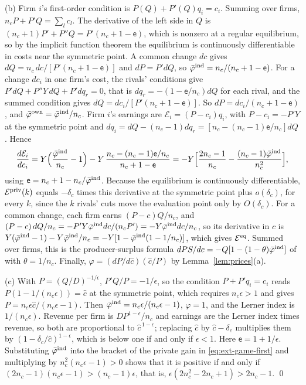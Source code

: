 (b) Firm $i$'s first-order condition is $P(Q)+P'(Q)q_i=c_i$. Summing over firms, $n_cP+P'Q=\sum_lc_l$. The derivative of the left side in $Q$ is $(n_c+1)P'+P''Q=P'(n_c+1-\mathsf e)$, which is nonzero at a regular equilibrium, so by the implicit function theorem the equilibrium is continuously differentiable in costs near the symmetric point. A common change $dc$ gives $dQ=n_c\,dc/[P'(n_c+1-\mathsf e)]$ and $dP=P'dQ$, so $\bar\varphi^{\rm ind}=n_c/(n_c+1-\mathsf e)$. For a change $dc_i$ in one firm's cost, the rivals' conditions give $P'dQ+P''Y\,dQ+P'dq_r=0$, that is $dq_r=-(1-\mathsf e/n_c)dQ$ for each rival, and the summed condition gives $dQ=dc_i/[P'(n_c+1-\mathsf e)]$. So $dP=dc_i/(n_c+1-\mathsf e)$, and $\bar\varphi^{\rm own}=\bar\varphi^{\rm ind}/n_c$. Firm $i$'s earnings are $\mathcal E_i=(P-c_i)q_i$, with $P-c_i=-P'Y$ at the symmetric point and $dq_i=dQ-(n_c-1)dq_r=[n_c-(n_c-1)\mathsf e/n_c]dQ$. Hence
\[
\frac{d\mathcal E_i}{dc_i}=Y\Bigl(\frac{\bar\varphi^{\rm ind}}{n_c}-1\Bigr)-Y\,\frac{n_c-(n_c-1)\mathsf e/n_c}{n_c+1-\mathsf e}=-Y\Bigl[\frac{2n_c-1}{n_c}-\frac{(n_c-1)\bar\varphi^{\rm ind}}{n_c^2}\Bigr],
\]
using $\mathsf e=n_c+1-n_c/\bar\varphi^{\rm ind}$. Because the equilibrium is continuously differentiable, $\mathcal E^{\rm priv}(k)$ equals $-\delta_c$ times this derivative at the symmetric point plus $o(\delta_c)$, for every $k$, since the $k$ rivals' cuts move the evaluation point only by $O(\delta_c)$. For a common change, each firm earns $(P-c)Q/n_c$, and $(P-c)\,dQ/n_c=-P'Y\bar\varphi^{\rm ind}dc/(n_cP')=-Y\bar\varphi^{\rm ind}dc/n_c$, so its derivative in $c$ is $Y(\bar\varphi^{\rm ind}-1)-Y\bar\varphi^{\rm ind}/n_c=-Y[1-\bar\varphi^{\rm ind}(1-1/n_c)]$, which gives $\mathcal E^{\rm eq}$. Summed over firms, this is the producer-surplus formula $dPS/dc=-Q[1-(1-\theta)\bar\varphi^{\rm ind}]$ of \citet{weyl2013pass} with $\theta=1/n_c$. Finally, $\varphi=(dP/d\hat c)(\hat c/P)$ by Lemma~\ref{lem:prices}(a).

(c) With $P=(Q/D)^{-1/\epsilon}$, $P'Q/P=-1/\epsilon$, so the condition $P+P'q_i=c_i$ reads $P(1-1/(n_c\epsilon))=\hat c$ at the symmetric point, which requires $n_c\epsilon>1$ and gives $P=n_c\epsilon\hat c/(n_c\epsilon-1)$. Then $\bar\varphi^{\rm ind}=n_c\epsilon/(n_c\epsilon-1)$, $\varphi=1$, and the Lerner index is $1/(n_c\epsilon)$. Revenue per firm is $DP^{1-\epsilon}/n_c$ and earnings are the Lerner index times revenue, so both are proportional to $\hat c^{\,1-\epsilon}$; replacing $\hat c$ by $\hat c-\delta_c$ multiplies them by $(1-\delta_c/\hat c)^{1-\epsilon}$, which is below one if and only if $\epsilon<1$. Here $\mathsf e=1+1/\epsilon$. Substituting $\bar\varphi^{\rm ind}$ into the bracket of the private gain in \eqref{eq:ext-game-first} and multiplying by $n_c^2(n_c\epsilon-1)>0$ shows that it is positive if and only if $(2n_c-1)(n_c\epsilon-1)>(n_c-1)\epsilon$, that is, $\epsilon(2n_c^2-2n_c+1)>2n_c-1$. \qed

